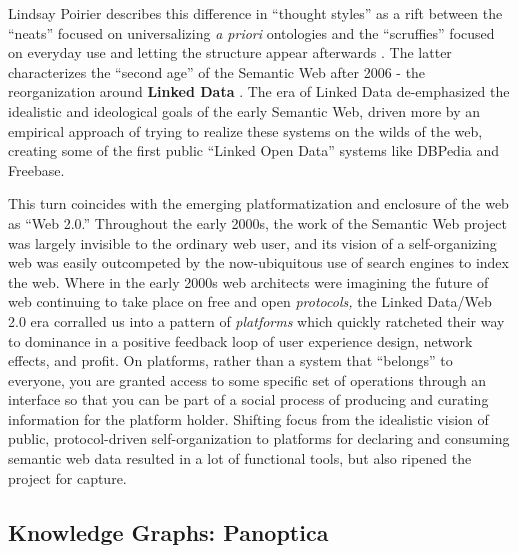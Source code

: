 \documentclass{article}
\begin{document}
Lindsay Poirier describes this difference in ``thought styles'' as a
rift between the ``neats'' focused on universalizing \emph{a priori}
ontologies and the ``scruffies'' focused on everyday use and letting the
structure appear afterwards \cite{poirierTurnScruffyEthnographic2017} . The latter characterizes the ``second age'' of the Semantic Web
after 2006 - the reorganization around \textbf{Linked Data} \cite{berners-leeLinkedData2006, hitzlerReviewSemanticWeb2021} . The era of
Linked Data de-emphasized the idealistic and ideological goals of the
early Semantic Web, driven more by an empirical approach of trying to
realize these systems on the wilds of the web, creating some of the
first public ``Linked Open Data'' systems like DBPedia and Freebase.

This turn coincides with the emerging platformatization and enclosure of
the web as ``Web 2.0.'' Throughout the early 2000s, the work of the
Semantic Web project was largely invisible to the ordinary web user, and
its vision of a self-organizing web was easily outcompeted by the
now-ubiquitous use of search engines to index the web. Where in the
early 2000s web architects were imagining the future of web continuing
to take place on free and open \emph{protocols,} the Linked Data/Web 2.0
era corralled us into a pattern of \emph{platforms} which quickly
ratcheted their way to dominance in a positive feedback loop of user
experience design, network effects, and profit. On platforms, rather
than a system that ``belongs'' to everyone, you are granted access to
some specific set of operations through an interface so that you can be
part of a social process of producing and curating information for the
platform holder. Shifting focus from the idealistic vision of public,
protocol-driven self-organization to platforms for declaring and
consuming semantic web data resulted in a lot of functional tools, but
also ripened the project for capture.

\hypertarget{knowledge-graphs-panoptica}{%
\subsection{Knowledge Graphs:
Panoptica}\label{knowledge-graphs-panoptica}}
\end{document}
